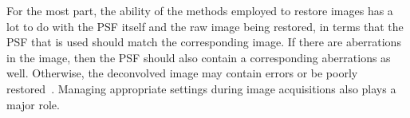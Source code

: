 For the most part, the ability of the methods employed to restore images has a lot to do with the PSF itself and the raw image being restored, in terms that the PSF that is used should match the corresponding image. 
If there are aberrations in the image, then the PSF should also contain a corresponding aberrations as well. 
Otherwise, the deconvolved image may contain errors or be poorly restored~\cite{DecArtif}. 
Managing appropriate settings during image acquisitions also plays a major role.


\renewcommand{\refname}{\spacedlowsmallcaps{References}} %

%


